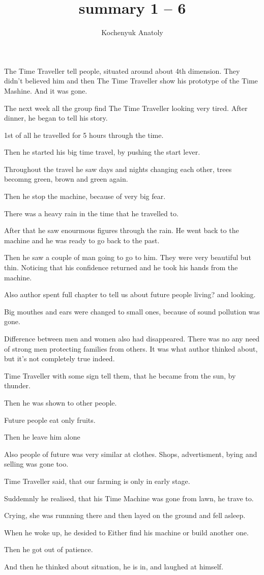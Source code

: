 \documentclass[12pt,a5paper]{article}
\author{Kochenyuk Anatoly}
\title{summary 1 -- 6}
\begin{document}
\maketitle
The Time Traveller tell people, situated around about 4th dimension. They didn't believed him and then The Time Traveller show his prototype of the Time Mashine. And it was gone.

The next week all the group find The Time Traveller looking very tired. After dinner, he began to tell his story.

1st of all he travelled for 5 hours through the time.

Then he started his big time travel, by pushing the start lever.

Throughout the travel he saw days and nights changing each other, trees  becomng green, brown and green again.

Then he stop the machine, because of very big fear.

There was a heavy rain in the time that he travelled to.

After that he saw enourmous figures through the rain. He went back to the machine and he was ready to go back to the past.

Then he saw a couple of man going to go to him. They were very beautiful but thin. Noticing that his confidence returned and he took his hands from the machine. 

Also author spent full chapter to tell us about future people living? and looking.

Big mouthes and ears were changed to small ones, because of sound pollution was gone.

Difference between men and women also had disappeared. There was no any need of strong men protecting families from others. It was what author thinked about, but it's not completely true indeed.

Time Traveller with some sign tell them, that he became from the sun, by thunder.

Then he was shown to other people.

Future people eat only fruits.

Then he leave him alone 

Also people of future was very similar at clothes. Shops, advertisment, bying and selling was gone too.

Time Traveller said, that our farming is only in early stage.

Suddemnly he realised, that his Time Machine was gone from lawn, he trave to.

Crying, she was runnning there and then layed on the ground and fell asleep.

When he woke up, he desided to Either find his machine or build another one.

Then he got out of patience.

And then he thinked about situation, he is in, and laughed at himself.
\end{document}
